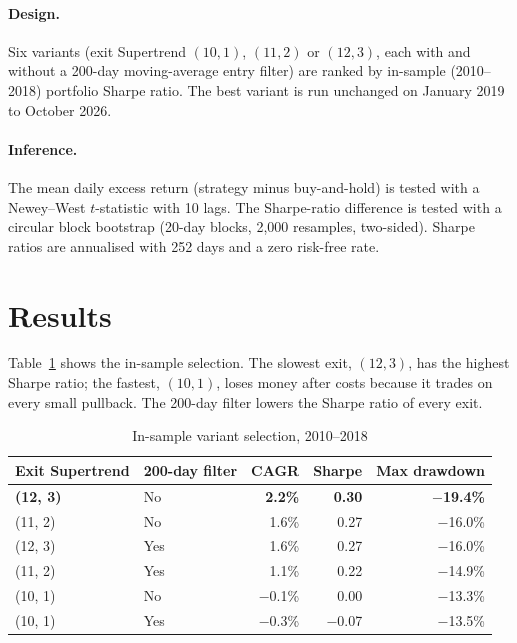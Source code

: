 \documentclass[11pt]{article}
\begin{document}
\paragraph{Design.} Six variants (exit Supertrend $(10,1)$, $(11,2)$ or $(12,3)$, each with and without a 200-day
moving-average entry filter) are ranked by in-sample (2010--2018) portfolio Sharpe ratio. The best variant is run
unchanged on January 2019 to October 2026.

\paragraph{Inference.} The mean daily excess return (strategy minus buy-and-hold) is tested with a Newey--West
$t$-statistic with 10 lags. The Sharpe-ratio difference is tested with a circular block bootstrap (20-day blocks,
2,000 resamples, two-sided). Sharpe ratios are annualised with 252 days and a zero risk-free rate.

\section{Results}

Table~\ref{tab:select} shows the in-sample selection. The slowest exit, $(12, 3)$, has the highest Sharpe ratio;
the fastest, $(10, 1)$, loses money after costs because it trades on every small pullback. The 200-day filter
lowers the Sharpe ratio of every exit.

\begin{table}[ht]
\centering
\caption{In-sample variant selection, 2010--2018}
\label{tab:select}
\small
\begin{tabular}{llrrr}
\toprule
Exit Supertrend & 200-day filter & CAGR & Sharpe & Max drawdown \\
\midrule
\textbf{(12, 3)} & No & \textbf{2.2\%} & \textbf{0.30} & \textbf{$-$19.4\%} \\
(11, 2) & No & 1.6\% & 0.27 & $-$16.0\% \\
(12, 3) & Yes & 1.6\% & 0.27 & $-$16.0\% \\
(11, 2) & Yes & 1.1\% & 0.22 & $-$14.9\% \\
(10, 1) & No & $-$0.1\% & 0.00 & $-$13.3\% \\
(10, 1) & Yes & $-$0.3\% & $-$0.07 & $-$13.5\% \\
\bottomrule
\end{tabular}
\end{table}
\end{document}
